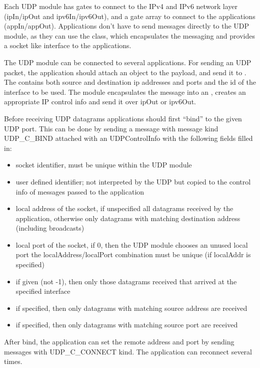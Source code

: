 Each UDP module has gates to connect to the IPv4 and IPv6 network layer
(ipIn/ipOut and ipv6In/ipv6Out), and a gate array to connect to the applications
(appIn/appOut). Applications don't have to send messages directly to the UDP module,
as they can use the  class, which encapsulates the messaging and
provides a socket like interface to the applications.

The UDP module can be connected to several applications.
For sending an UDP packet, the application should attach an 
object to the payload, and send it to . The 
contains both source and destination ip addresses and ports and the id of the interface
to be used. The  module encapsulates the message into an ,
creates an appropriate IP control info and send it over ipOut or ipv6Out.

Before receiving UDP datagrams applications should first ``bind'' to the given UDP port.
This can be done by sending a message with message kind UDP\_C\_BIND attached with an
UDPControlInfo with the following fields filled in:
\begin{itemize}
  \item {} socket identifier, must be unique within the UDP module
  \item {} user defined identifier; not interpreted by the UDP but copied to the control info
                      of messages passed to the application
  \item {} local address of the socket, if unspecified all datagrams received
        by the application, otherwise only datagrams with matching destination address (including broadcasts)
  \item {} local port of the socket, if 0, then the UDP module chooses an unused local port
                         the localAddress/localPort combination must be unique (if localAddr is specified)
  \item {} if given (not -1), then only those datagrams received that arrived at the specified interface
  \item {} if specified, then only datagrams with matching source address are received
  \item {} if specified, then only datagrams with matching source port are received
\end{itemize}

After bind, the application can set the remote address and port by sending messages with
UDP\_C\_CONNECT kind. The application can reconnect several times.

